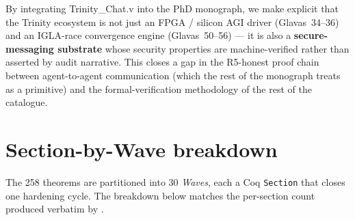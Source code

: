 By integrating Trinity\_Chat.v into the PhD monograph, we make explicit
that the Trinity ecosystem is not just an FPGA / silicon AGI driver
(Glavas~34--36) and an IGLA-race convergence engine
(Glavas~50--56) --- it is also a \textbf{secure-messaging substrate}
whose security properties are machine-verified rather than asserted by
audit narrative. This closes a gap in the R5-honest proof chain
between agent-to-agent communication (which the rest of the monograph
treats as a primitive) and the formal-verification methodology of the
rest of the catalogue.

\section{Section-by-Wave breakdown}
\label{sec:chat:waves}

The 258 theorems are partitioned into 30 \emph{Waves}, each a Coq
\texttt{Section} that closes one hardening cycle. The breakdown below
matches the per-section count produced verbatim by
.


